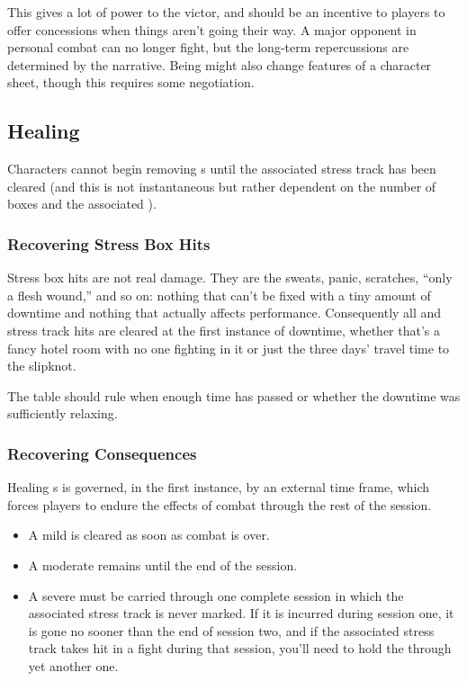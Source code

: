 This gives a lot of power to the victor, and should be an incentive to players to offer concessions when things aren't going their way. A major opponent \TakenOut{} in personal combat can no longer fight, but the long-term repercussions are determined by the narrative. Being \TakenOut{} might also change features of a character sheet, though this requires some negotiation.

\subsection{Healing}
\label{sec:personal-combat-healing}

Characters cannot begin removing \Consequence{}s until the associated stress track has been cleared (and this is not instantaneous but rather dependent on the number of boxes and the associated \Skill{}).

\subsubsection{Recovering Stress Box Hits}

Stress box hits are not real damage. They are the sweats, panic, scratches, ``only a flesh wound,'' and so on: nothing that can't be fixed with a tiny amount of downtime and nothing that actually affects performance. Consequently all \Health{} and \Composure{} stress track hits are cleared at the first instance of downtime, whether that's a fancy hotel room with no one fighting in it or just the three days' travel time to the slipknot.

 The table should rule when enough time has passed or whether the downtime was sufficiently relaxing.



\iflandscape{}{\vfil}


\subsubsection{Recovering Consequences}

Healing \Consequence{}s is governed, in the first instance, by an external time frame, which forces players to endure the effects of combat through the rest of the session.
\begin{itemize}
\item A mild \Consequence{} is cleared as soon as combat is over.
\item A moderate \Consequence{} remains until the end of the session.
\item A severe \Consequence{} must be carried through one complete session in which the associated stress track is never marked. If it is incurred during session one, it is gone no sooner than the end of session two, and if the associated stress track takes hit in a fight during that session, you'll need to hold the \Consequence{} through yet another one.
\end{itemize}

